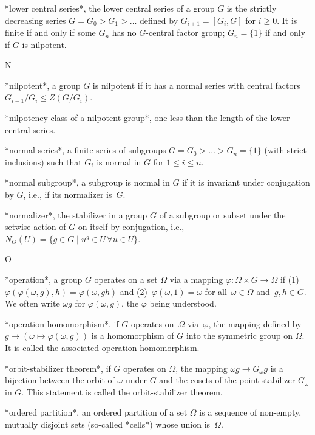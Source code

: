 *lower central  series*, the lower central  series of a  group $G$ is the
strictly decreasing series $G = G_0 > G_1 > \ldots$ defined by $G_{i+1} =
[G_i,G]$ for $i\ge  0$. It is  finite if and  only if  some  $G_n$ has no
$G$-central factor group; $G_n=\{1\}$ if and only if $G$ is nilpotent.

 N

*nilpotent*, a group $G$   is nilpotent if it   has a normal series  with
central factors $G_{i-1}/G_i \le Z(G/G_i)$.

*nilpotency class of a nilpotent group*, one  less than the length of the
lower central series.

*normal series*, a finite series of  subgroups $G = G_0 >  \ldots > G_n =
\{1\}$  (with  strict inclusions) such that   $G_i$ is normal  in $G$ for
$1\leq i\leq n$.

*normal subgroup*, a subgroup is normal  in $G$ if  it is invariant under
conjugation by $G$, i.e., if its normalizer is~$G$.

*normalizer*, the stabilizer in a group $G$ of a subgroup or subset under
the setwise action   of $G$ on  itself by  conjugation,  i.e., $N_G(U)  =
\{g\in G\mid u^g\in U\,\forall u\in U\}$.

 O

*operation*,   a group $G$  operates on   a  set $\Omega$  via a  mapping
$\varphi\colon         \Omega\times            G\to     \Omega$        if
(1)~$\varphi(\varphi(\omega,g),h)      =      \varphi(\omega,gh)$     and
(2)~$\varphi(\omega,1)=\omega$ for all~$\omega\in \Omega$ and~$g,h\in G$.
We  often write $\omega g$  for  $\varphi(\omega,g)$, the $\varphi$ being
understood.

*operation homomorphism*, if  $G$ operates on~$\Omega$ via~$\varphi$, the
mapping defined by $g  \mapsto  (\omega \mapsto \varphi(\omega,g))$  is a
homomorphism of $G$  into the symmetric group on  $\Omega$. It  is called
the associated operation homomorphism.

*orbit-stabilizer theorem*,  if   $G$ operates on  $\Omega$,  the mapping
$\omega  g \to G_\omega  g$ is a  bijection between the orbit of $\omega$
under $G$ and the cosets of the point stabilizer  $G_\omega$ in $G$. This
statement is called the orbit-stabilizer theorem.

*ordered partition*, an ordered partition of a set $\Omega$ is a sequence
of   non-empty, mutually disjoint  sets  (so-called  *cells*) whose union
is~$\Omega$.

